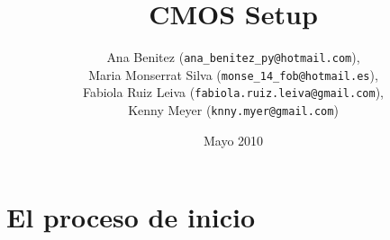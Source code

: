 \documentclass[12pt,oneside,a4paper]{article}
\begin{document}
\title{CMOS Setup}
\author{Ana Benitez (\texttt{ana\_benitez\_py@hotmail.com}), \\
		Maria Monserrat Silva (\texttt{monse\_14\_fob@hotmail.es}), \\
		Fabiola Ruiz Leiva (\texttt{fabiola.ruiz.leiva@gmail.com}), \\ 
		Kenny Meyer (\texttt{knny.myer@gmail.com})}
\date{Mayo 2010}
\maketitle
\clearpage

%

% 
\setcounter{tocdepth}{3}
\tableofcontents
\newpage



\section{El proceso de inicio}\label{sec:arranque}

\end{document}
